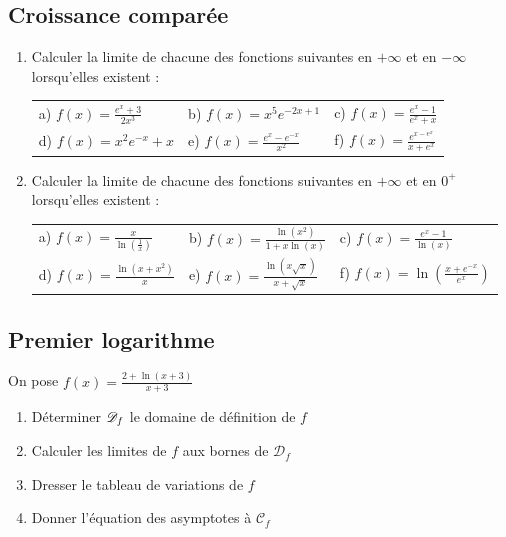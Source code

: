 \documentclass[oneside,12pt]{book}          %
\begin{document}
\subsection{Croissance comparée}
\begin{enumerate}
    \item Calculer la limite de chacune des fonctions suivantes en $+\infty$ et en $-\infty$ lorsqu'elles existent :\\
    \begin{tabular}{p{} p{} p{}}
        a) $f(x)=\frac{e^x+3}{2x^3}$ & b) $f(x)=x^5e^{-2x+1}$ & c) $f(x)=\frac{e^x-1}{e^x+x}$\\
        d) $f(x)=x^2e^{-x}+x$ & e) $f(x)=\frac{e^x-e^{-x}}{x^2}$ & f) $f(x)=\frac{e^{x-e^x}}{x+e^x}$
    \end{tabular}

    \item Calculer la limite de chacune des fonctions suivantes en $+\infty$ et en $0^+$ lorsqu'elles existent :\\
    \begin{tabular}{p{} p{} p{}}
        a) $f(x)=\frac{x}{\ln\left(\frac{1}{x}\right)}$ & b) $f(x)=\frac{\ln\left(x^2\right)}{1+x\ln(x)}$ & c) $f(x)=\frac{e^x-1}{\ln(x)}$\\
        d) $f(x)=\frac{\ln\left(x+x^2\right)}{x}$ & e) $f(x)=\frac{\ln\left(x\sqrt{x}\right)}{x+\sqrt{x}}$ & f) $f(x)=\ln\left(\frac{x+e^{-x}}{e^x}\right) $
    \end{tabular}
\end{enumerate}



\subsection{Premier logarithme}
On pose $f(x) = \frac{2 + \ln(x+3)}{x+3}$
\begin{enumerate}
    \item Déterminer ${\mathscr{D}}_f$ le domaine de définition de $f$
    \item Calculer les limites de $f$ aux bornes de $\mathcal{D}_f$
    \item Dresser le tableau de variations de $f$
    \item Donner l'équation des asymptotes à $\mathcal{C}_f$
\end{enumerate}
\end{document}

